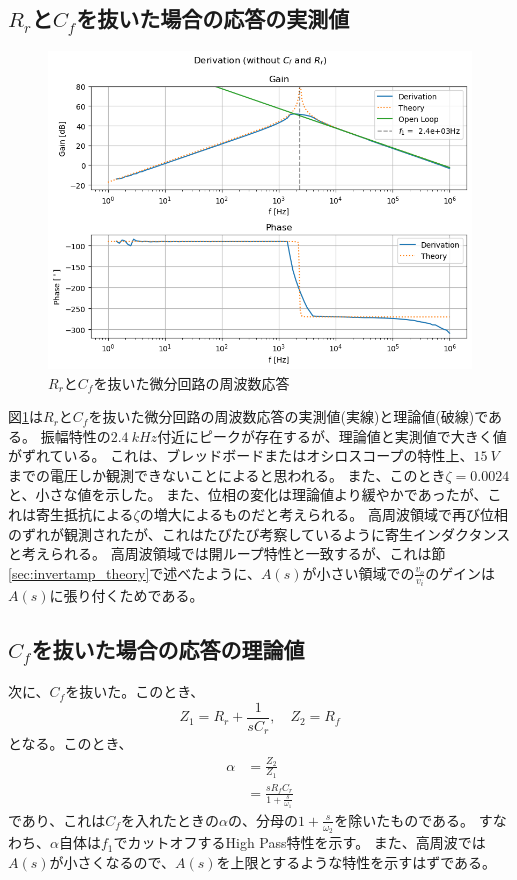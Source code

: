 \documentclass[a4paper]{ltjsarticle}
\begin{document}
\subsection{$R_r$と$C_f$を抜いた場合の応答の実測値}
\begin{figure}[htbp]
    \centering
    \includegraphics[width=0.8\columnwidth]{./images/dervamp2_bode.png}
    \caption{$R_r$と$C_f$を抜いた微分回路の周波数応答}
    \label{fig:dervamp2_bode}
\end{figure}
図\ref{fig:dervamp2_bode}は$R_r$と$C_f$を抜いた微分回路の周波数応答の実測値(実線)と理論値(破線)である。
振幅特性の$\SI{2.4}{kHz}$付近にピークが存在するが、理論値と実測値で大きく値がずれている。
これは、ブレッドボードまたはオシロスコープの特性上、$\SI{15}{V}$までの電圧しか観測できないことによると思われる。
また、このとき$\zeta=0.0024$と、小さな値を示した。
また、位相の変化は理論値より緩やかであったが、これは寄生抵抗による$\zeta$の増大によるものだと考えられる。
高周波領域で再び位相のずれが観測されたが、これはたびたび考察しているように寄生インダクタンスと考えられる。
高周波領域では開ループ特性と一致するが、これは節\ref{sec:invertamp_theory}で述べたように、$A(s)$が小さい領域での$\frac{v_o}{v_i}$のゲインは$A(s)$に張り付くためである。

\subsection{$C_f$を抜いた場合の応答の理論値}
次に、$C_f$を抜いた。このとき、
\begin{equation*}
    Z_1 = R_r+\frac{1}{sC_r},\quad Z_2 = R_f
\end{equation*}
となる。このとき、
\begin{align}
    \alpha &= \frac{Z_2}{Z_1} \nonumber \\
    &= \frac{sR_fC_r}{1+\frac{s}{\omega_1}}
\end{align}
であり、これは$C_f$を入れたときの$\alpha$の、分母の$1+\frac{s}{\omega_2}$を除いたものである。
すなわち、$\alpha$自体は$f_1$でカットオフするHigh Pass特性を示す。
また、高周波では$A(s)$が小さくなるので、$A(s)$を上限とするような特性を示すはずである。
\end{document}
